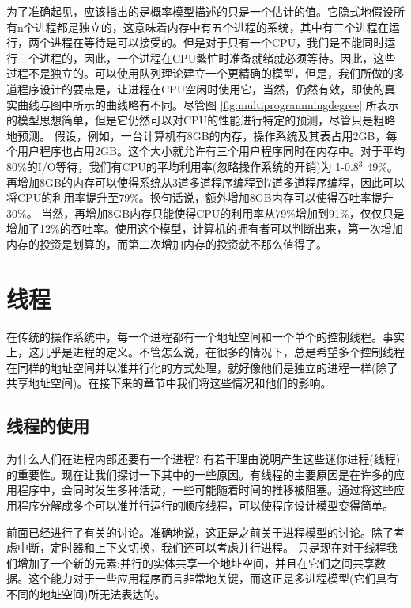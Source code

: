 	为了准确起见，应该指出的是概率模型描述的只是一个估计的值。它隐式地假设所有n个进程都是独立的，这意味着内存中有五个进程的系统，其中有三个进程在运行，两个进程在等待是可以接受的。但是对于只有一个CPU，我们是不能同时运行三个进程的，因此，一个进程在CPU繁忙时准备就绪就必须等待。因此，这些过程不是独立的。可以使用队列理论建立一个更精确的模型，但是，我们所做的多道程序设计的要点是，让进程在CPU空闲时使用它，当然，仍然有效，即使的真实曲线与图中所示的曲线略有不同。尽管图 \ref{fig:multiprogrammingdegree} 所表示的模型思想简单，但是它仍然可以对CPU的性能进行特定的预测，尽管只是粗略地预测。
	假设，例如，一台计算机有8GB的内存，操作系统及其表占用2GB，每个用户程序也占用2GB。这个大小就允许有三个用户程序同时在内存中。对于平均80\%的I/O等待，我们有CPU的平均利用率(忽略操作系统的开销)为 1-0.8$^{3}$ 49\%。再增加8GB的内存可以使得系统从3道多道程序编程到7道多道程序编程，因此可以将CPU的利用率提升至79\%。换句话说，额外增加8GB内存可以使得吞吐率提升30\%。
	当然，再增加8GB内存只能使得CPU的利用率从79\%增加到91\%，仅仅只是增加了12\%的吞吐率。使用这个模型，计算机的拥有者可以判断出来，第一次增加内存的投资是划算的，而第二次增加内存的投资就不那么值得了。
	
	\section{线程}
	
	在传统的操作系统中，每一个进程都有一个地址空间和一个单个的控制线程。事实上，这几乎是进程的定义。不管怎么说，在很多的情况下，总是希望多个控制线程在同样的地址空间并以准并行化的方式处理，就好像他们是独立的进程一样(除了共享地址空间)。在接下来的章节中我们将这些情况和他们的影响。
	
	\subsection{线程的使用}
	
	为什么人们在进程内部还要有一个进程? 有若干理由说明产生这些迷你进程(线程)的重要性。现在让我们探讨一下其中的一些原因。有线程的主要原因是在许多的应用程序中，会同时发生多种活动，一些可能随着时间的推移被阻塞。通过将这些应用程序分解成多个可以准并行运行的顺序线程，可以使程序设计模型变得简单。
	
	前面已经进行了有关的讨论。准确地说，这正是之前关于进程模型的讨论。除了考虑中断，定时器和上下文切换，我们还可以考虑并行进程。
	只是现在对于线程我们增加了一个新的元素:并行的实体共享一个地址空间，并且在它们之间共享数据。这个能力对于一些应用程序而言非常地关键，而这正是多进程模型(它们具有不同的地址空间)所无法表达的。
	
